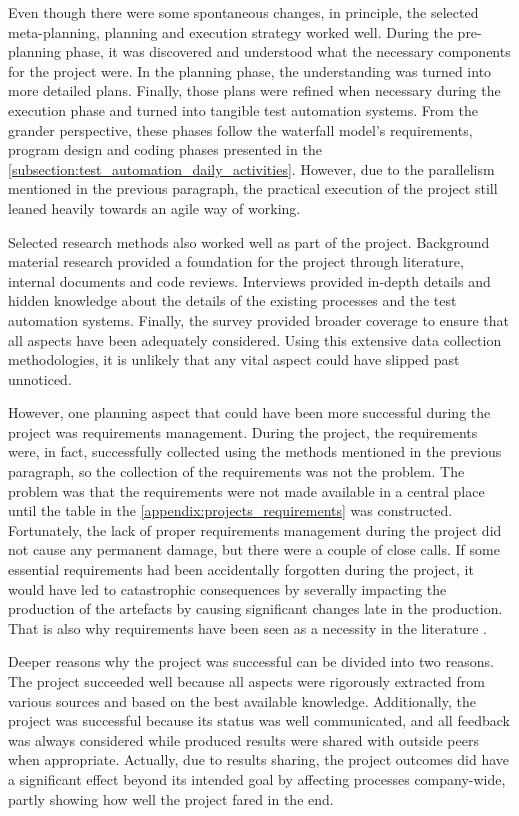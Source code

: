 Even though there were some spontaneous changes, in principle, the selected meta-planning, planning and execution strategy worked well. During the pre-planning phase, it was discovered and understood what the necessary components for the project were. In the planning phase, the understanding was turned into more detailed plans. Finally, those plans were refined when necessary during the execution phase and turned into tangible test automation systems. From the grander perspective, these phases follow the waterfall model's requirements, program design and coding phases \cite{royce1987managing} presented in the \autoref{subsection:test_automation_daily_activities}. However, due to the parallelism mentioned in the previous paragraph, the practical execution of the project still leaned heavily towards an agile way of working.

Selected research methods also worked well as part of the project. Background material research provided a foundation for the project through literature, internal documents and code reviews. Interviews provided in-depth details and hidden knowledge about the details of the existing processes and the test automation systems. Finally, the survey provided broader coverage to ensure that all aspects have been adequately considered. Using this extensive data collection methodologies, it is unlikely that any vital aspect could have slipped past unnoticed.

However, one planning aspect that could have been more successful during the project was requirements management. During the project, the requirements were, in fact, successfully collected using the methods mentioned in the previous paragraph, so the collection of the requirements was not the problem. The problem was that the requirements were not made available in a central place until the table in the \autoref{appendix:projects_requirements} was constructed. Fortunately, the lack of proper requirements management during the project did not cause any permanent damage, but there were a couple of close calls. If some essential requirements had been accidentally forgotten during the project, it would have led to catastrophic consequences by severally impacting the production of the artefacts by causing significant changes late in the production. That is also why requirements have been seen as a necessity in the literature \cite{hood2007requirements}.

Deeper reasons why the project was successful can be divided into two reasons. The project succeeded well because all aspects were rigorously extracted from various sources and based on the best available knowledge. Additionally, the project was successful because its status was well communicated, and all feedback was always considered while produced results were shared with outside peers when appropriate. Actually, due to results sharing, the project outcomes did have a significant effect beyond its intended goal by affecting processes company-wide, partly showing how well the project fared in the end.


